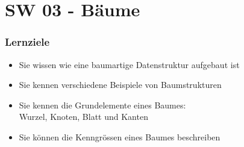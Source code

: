\part{SW 03 - Bäume}
\section{Lernziele}
\begin{itemize}[noitemsep,topsep=0pt,leftmargin=*]
    \item Sie wissen wie eine baumartige Datenstruktur aufgebaut ist
    \item Sie kennen verschiedene Beispiele von Baumstrukturen
    \item Sie kennen die Grundelemente eines Baumes:\\
    Wurzel, Knoten, Blatt und Kanten
    \item Sie können die Kenngrössen eines Baumes beschreiben
\end{itemize}

